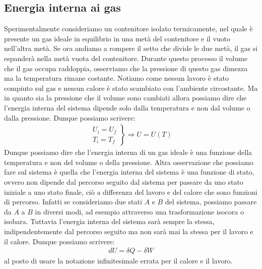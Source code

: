     \subsection{Energia interna ai gas}
        Sperimentalmente consideriamo un contenitore isolato termicamente, nel quale è presente un gas ideale in equilibrio in una metà del contenitore e il vuoto nell'altra metà. Se ora andiamo a rompere il setto che divide le due metà, il gas si espanderà nella metà vuota del contenitore. Durante questo processo il volume che il gas occupa raddoppia, osserviamo che la pressione di questo gas dimezza ma la temperatura rimane costante. Notiamo come nessun lavoro è stato compiuto sul gas e nessun calore è stato scambiato con l'ambiente circostante. Ma in quanto sia la pressione che il volume sono cambiati allora possiamo dire che l'energia interna del sistema dipende solo dalla temperatura e non dal volume o dalla pressione. Dunque possiamo scrivere:
        \begin{align*}
            \left.\begin{aligned}
                U_i = U_f\\
                T_i = T_f
            \end{aligned}\right\}\Rightarrow U=U(T)
        \end{align*}
        Dunque possiamo dire che l'energia interna di un gas ideale è una funzione della temperatura e non del volume o della pressione.\newline
        Altra osservazione che possiamo fare sul sistema è quella che l'energia interna del sistema è una funzione di stato, ovvero non dipende dal percorso seguito dal sistema per passare da uno stato iniziale a uno stato finale, ciò a differenza del lavoro e del calore che sono funzioni di percorso. Infatti se consideriamo due stati $A$ e $B$ del sistema, possiamo passare da $A$ a $B$ in diversi modi, ad esempio attraverso una trasformazione isocora o isobara. Tuttavia l'energia interna del sistema sarà sempre la stessa, indipendentemente dal percorso seguito ma non sarà mai la stessa per il lavoro e il calore. Dunque possiamo scrivere:
        \begin{align*}
            d U = \delta Q - \delta W
        \end{align*}
        al posto di usare la notazione infinitesimale errata per il calore e il lavoro.